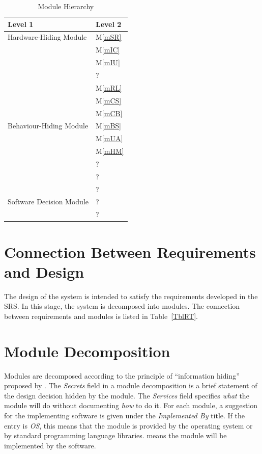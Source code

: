 \documentclass[12pt, titlepage]{article}
\newcommand{\mref}[1]{M\ref{#1}}
\begin{document}
\begin{table}[h!]
\centering
\begin{tabular}{p{} p{}}
\toprule
\textbf{Level 1} & \textbf{Level 2}\\
\midrule

{Hardware-Hiding Module} & \mref{mSR}\\
& \mref{mIC}\\
& \mref{mIU}\\
& ?\\
\midrule

\multirow{7}{0.3\textwidth}{Behaviour-Hiding Module} & \mref{mRL} \\
& \mref{mCS}\\
& \mref{mCB} \\
& \mref{mBS}\\
& \mref{mUA}\\
& \mref{mHM}\\
& ?\\ 
& ?\\
\midrule

\multirow{3}{0.3\textwidth}{Software Decision Module} & {?}\\
& ?\\
& ?\\
\bottomrule

\end{tabular}
\caption{Module Hierarchy}
\label{TblMH}
\end{table}

\section{Connection Between Requirements and Design} \label{SecConnection}

The design of the system is intended to satisfy the requirements developed in
the SRS. In this stage, the system is decomposed into modules. The connection
between requirements and modules is listed in Table~\ref{TblRT}.

\section{Module Decomposition} \label{SecMD}

Modules are decomposed according to the principle of ``information hiding''
proposed by \citet{ParnasEtAl1984}. The \emph{Secrets} field in a module
decomposition is a brief statement of the design decision hidden by the
module. The \emph{Services} field specifies \emph{what} the module will do
without documenting \emph{how} to do it. For each module, a suggestion for the
implementing software is given under the \emph{Implemented By} title. If the
entry is \emph{OS}, this means that the module is provided by the operating
system or by standard programming language libraries.  \emph{\progname{}} means the
module will be implemented by the \progname{} software.
\end{document}
